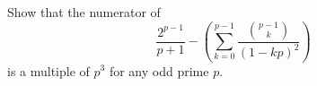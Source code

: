 Show that the numerator of \[ \frac{2^{p-1}}{p+1} - \left(\sum_{k = 0}^{p-1}\frac{\binom{p-1}{k}}{(1-kp)^2}\right) \] is a multiple of $p^3$ for any odd prime $p$.

